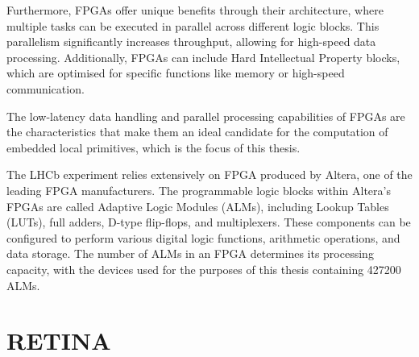 Furthermore, FPGAs offer unique benefits through their architecture, where multiple tasks can be executed in parallel across different logic blocks. This parallelism significantly increases throughput, allowing for high-speed data processing. Additionally, FPGAs can include Hard Intellectual Property blocks, which are optimised for specific functions like memory or high-speed communication.

The low-latency data handling and parallel processing capabilities of FPGAs are the characteristics that make them an ideal candidate for the computation of embedded local primitives, which is the focus of this thesis.

The LHCb experiment relies extensively on FPGA produced by Altera, one of the leading FPGA manufacturers. The programmable logic blocks within Altera's FPGAs are called Adaptive Logic Modules (ALMs), including Lookup Tables (LUTs), full adders, D-type flip-flops, and multiplexers. These components can be configured to perform various digital logic functions, arithmetic operations, and data storage. The number of ALMs in an FPGA determines its processing capacity, with the devices used for the purposes of this thesis containing 427200 ALMs.




\section{RETINA}

